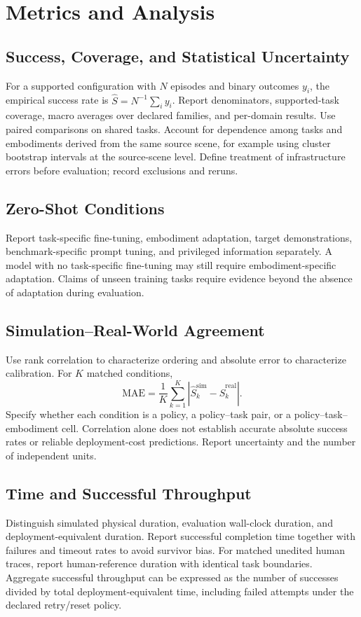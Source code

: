\section{Metrics and Analysis}
\label{sec:gb_metrics}

\subsection{Success, Coverage, and Statistical Uncertainty}
For a supported configuration with $N$ episodes and binary outcomes $y_i$, the empirical success rate is $\widehat S=N^{-1}\sum_i y_i$. Report denominators, supported-task coverage, macro averages over declared families, and per-domain results. Use paired comparisons on shared tasks. Account for dependence among tasks and embodiments derived from the same source scene, for example using cluster bootstrap intervals at the source-scene level. Define treatment of infrastructure errors before evaluation; record exclusions and reruns.

\subsection{Zero-Shot Conditions}
Report task-specific fine-tuning, embodiment adaptation, target demonstrations, benchmark-specific prompt tuning, and privileged information separately. A model with no task-specific fine-tuning may still require embodiment-specific adaptation. Claims of unseen training tasks require evidence beyond the absence of adaptation during evaluation.

\subsection{Simulation--Real-World Agreement}
Use rank correlation to characterize ordering and absolute error to characterize calibration. For $K$ matched conditions,
\begin{equation}
\mathrm{MAE}=\frac{1}{K}\sum_{k=1}^{K}|\widehat S_k^{\mathrm{sim}}-\widehat S_k^{\mathrm{real}}|.
\end{equation}
Specify whether each condition is a policy, a policy--task pair, or a policy--task--embodiment cell. Correlation alone does not establish accurate absolute success rates or reliable deployment-cost predictions. Report uncertainty and the number of independent units.

\subsection{Time and Successful Throughput}
Distinguish simulated physical duration, evaluation wall-clock duration, and deployment-equivalent duration. Report successful completion time together with failures and timeout rates to avoid survivor bias. For matched unedited human traces, report human-reference duration with identical task boundaries. Aggregate successful throughput can be expressed as the number of successes divided by total deployment-equivalent time, including failed attempts under the declared retry/reset policy.


